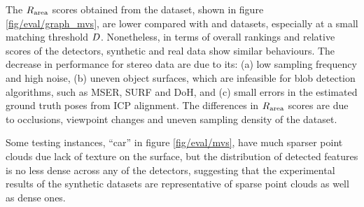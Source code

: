 The $R_\textrm{area}$ scores obtained from the \stereoset dataset, shown in figure \ref{fig/eval/graph_mvs}, are lower compared with \meshset and \mriset datasets, especially at a small matching threshold $D$. Nonetheless, in terms of overall rankings and relative scores of the detectors, synthetic and real data show similar behaviours. The decrease in performance for stereo data are due to its: (a) low sampling frequency and high noise, (b) uneven object surfaces, which are infeasible for blob detection algorithms, such as MSER, SURF and DoH, and (c) small errors in the estimated ground truth poses from ICP alignment.
The differences in $R_\textrm{area}$ scores are due to occlusions, viewpoint changes and uneven sampling density of the \stereoset dataset. 

Some testing instances, \eg ``car'' in figure \ref{fig/eval/mvs}, have much sparser point clouds due lack of texture on the surface, but the distribution of detected features is no less dense across any of the detectors, suggesting that the experimental results of the synthetic datasets are representative of sparse point clouds as well as dense ones.

